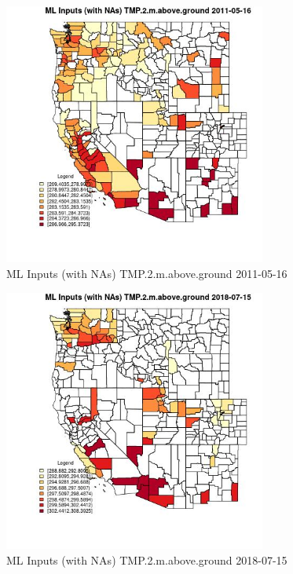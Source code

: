 \begin{figure} 
\centering  
\includegraphics[width=0.77\textwidth]{Code_Outputs/Report_ML_input_PM25_Step4_part_e_de_duplicated_aves_compiled_2019-05-21wNAs_CountyTMP2mabovegroundMean2011-05-16.jpg} 
\caption{\label{fig:Report_ML_input_PM25_Step4_part_e_de_duplicated_aves_compiled_2019-05-21wNAsCountyTMP2mabovegroundMean2011-05-16}ML Inputs (with NAs) TMP.2.m.above.ground 2011-05-16} 
\end{figure} 
 

\begin{figure} 
\centering  
\includegraphics[width=0.77\textwidth]{Code_Outputs/Report_ML_input_PM25_Step4_part_e_de_duplicated_aves_compiled_2019-05-21wNAs_CountyTMP2mabovegroundMean2018-07-15.jpg} 
\caption{\label{fig:Report_ML_input_PM25_Step4_part_e_de_duplicated_aves_compiled_2019-05-21wNAsCountyTMP2mabovegroundMean2018-07-15}ML Inputs (with NAs) TMP.2.m.above.ground 2018-07-15} 
\end{figure} 
 

